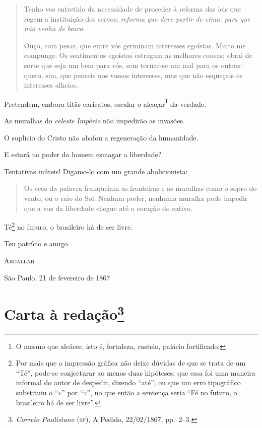 \begin{quote}
Tenho vos entretido da necessidade de proceder à reforma das leis que
regem a instituição dos servos; \emph{reforma que deve partir de cima,
para que não venha de baixo}.

Ouço, com pesar, que entre vós germinam interesses egoístas. Muito me
compunge. Os sentimentos egoístas estragam as melhores cousas; obrai de
sorte que seja um bem para vós, sem tornar-se um mal para os outros:
quero, sim, que penseis nos vossos interesses, mas que não esqueçais os
interesses alheios.
\end{quote}

Pretendem, embora titãs caricatos, escalar o alcaçar\footnote{O mesmo
  que alcácer, isto é, fortaleza, castelo, palácio fortificado.} da
verdade.

As muralhas do \emph{celeste} \emph{Império} não impedirão as invasões.

O suplício do Cristo não abafou a regeneração da humanidade.

E estará no poder do homem esmagar a liberdade?

Tentativas inúteis! Digamo-lo com um grande abolicionista:

\begin{quote}
Os ecos da palavra franqueiam as fronteiras e as muralhas como o sopro
do vento, ou o raio do Sol. Nenhum poder, nenhuma muralha pode impedir
que a voz da liberdade chegue até o coração do cativo.
\end{quote}

Té\footnote{Por mais que a impressão gráfica não deixe dúvidas de que
  se trata de um ``Té'', pode-se conjecturar ao menos duas hipóteses: que
  essa foi uma maneira informal do autor de despedir, dizendo ``até''; ou
  que um erro tipográfico substituiu o ``\textsc{f}'' por ``\textsc{t}'', no que então a
  sentença seria ``Fé no futuro, o brasileiro há de ser livre''.} no
futuro, o brasileiro há de ser livre.

\begin{flushright}
Teu patrício e amigo

\textsc{Abdallah}

São Paulo, 21 de fevereiro de 1867
\end{flushright}

\chapter{Carta à redação\footnote{\emph{Correio Paulistano} (\textsc{sp}),
  A Pedido, 22/02/1867, pp.~2--3.}}


